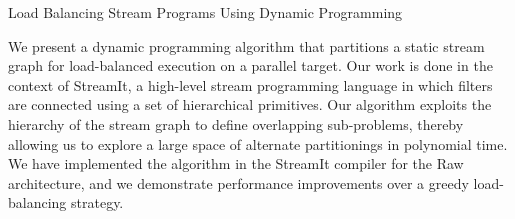 Load Balancing Stream Programs Using Dynamic Programming

We present a dynamic programming algorithm that partitions a static
stream graph for load-balanced execution on a parallel target.  Our
work is done in the context of StreamIt, a high-level stream
programming language in which filters are connected using a set of
hierarchical primitives.  Our algorithm exploits the hierarchy of the
stream graph to define overlapping sub-problems, thereby allowing us
to explore a large space of alternate partitionings in polynomial
time.  We have implemented the algorithm in the StreamIt compiler for
the Raw architecture, and we demonstrate performance improvements over
a greedy load-balancing strategy.
